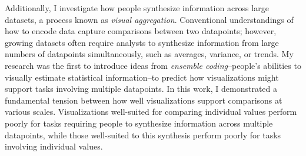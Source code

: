 \documentclass[11pt]{article}
\begin{document}
Additionally, I investigate how people synthesize information across large datasets, a process known as \emph{visual aggregation}. 
Conventional understandings of how to encode data capture comparisons between two datapoints; however, growing datasets often require analysts to synthesize information from large numbers of datapoints simultaneously, such as averages, variance, or trends. My research was the first to introduce ideas from \emph{ensemble coding}--people's abilities to visually estimate statistical information--to predict how visualizations might support tasks involving multiple datapoints. 
In this work, I demonstrated a fundamental tension between how well visualizations support comparisons at various scales. Visualizations well-suited for comparing individual values perform poorly for tasks requiring people to synthesize information across multiple datapoints, while those well-suited to this synthesis perform poorly for tasks involving individual values. 
\end{document}
